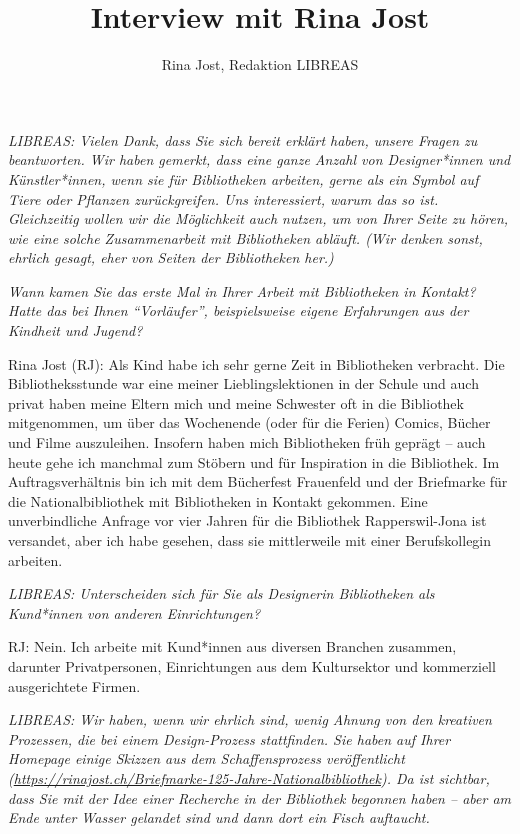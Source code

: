 \documentclass[a4paper,
fontsize=11pt,
oneside,
numbers=noperiodatend,
parskip=half-,
bibliography=totoc,
final
]{scrartcl}
\title{\LARGE{Interview mit Rina Jost}}%
\author{Rina Jost, Redaktion LIBREAS} %
\date{}
\begin{document}
\maketitle
\thispagestyle{fancyplain} 


\emph{LIBREAS: Vielen Dank, dass Sie sich bereit erklärt haben, unsere
Fragen zu beantworten. Wir haben gemerkt, dass eine ganze Anzahl von
Designer*innen und Künstler*innen, wenn sie für Bibliotheken arbeiten,
gerne als ein Symbol auf Tiere oder Pflanzen zurückgreifen. Uns
interessiert, warum das so ist. Gleichzeitig wollen wir die Möglichkeit
auch nutzen, um von Ihrer Seite zu hören, wie eine solche Zusammenarbeit
mit Bibliotheken abläuft. (Wir denken sonst, ehrlich gesagt, eher von
Seiten der Bibliotheken her.)}

\emph{Wann kamen Sie das erste Mal in Ihrer Arbeit mit Bibliotheken in
Kontakt? Hatte das bei Ihnen \enquote{Vorläufer}, beispielsweise eigene
Erfahrungen aus der Kindheit und Jugend?}

Rina Jost (RJ): Als Kind habe ich sehr gerne Zeit in Bibliotheken
verbracht. Die Bibliotheksstunde war eine meiner Lieblingslektionen in
der Schule und auch privat haben meine Eltern mich und meine Schwester
oft in die Bibliothek mitgenommen, um über das Wochenende (oder für die
Ferien) Comics, Bücher und Filme auszuleihen. Insofern haben mich
Bibliotheken früh geprägt -- auch heute gehe ich manchmal zum Stöbern
und für Inspiration in die Bibliothek. Im Auftragsverhältnis bin ich mit
dem Bücherfest Frauenfeld und der Briefmarke für die Nationalbibliothek
mit Bibliotheken in Kontakt gekommen. Eine unverbindliche Anfrage vor
vier Jahren für die Bibliothek Rapperswil-Jona ist versandet, aber ich
habe gesehen, dass sie mittlerweile mit einer Berufskollegin arbeiten.

\emph{LIBREAS: Unterscheiden sich für Sie als Designerin Bibliotheken
als Kund*innen von anderen Einrichtungen?}

RJ: Nein. Ich arbeite mit Kund*innen aus diversen Branchen zusammen,
darunter Privatpersonen, Einrichtungen aus dem Kultursektor und
kommerziell ausgerichtete Firmen.

\emph{LIBREAS: Wir haben, wenn wir ehrlich sind, wenig Ahnung von den
kreativen Prozessen, die bei einem Design-Prozess stattfinden. Sie haben
auf Ihrer Homepage einige Skizzen aus dem Schaffensprozess
veröffentlicht
(\url{https://rinajost.ch/Briefmarke-125-Jahre-Nationalbibliothek}). Da
ist sichtbar, dass Sie mit der Idee einer Recherche in der Bibliothek
begonnen haben -- aber am Ende unter Wasser gelandet sind und dann dort
ein Fisch auftaucht.}
\end{document}
